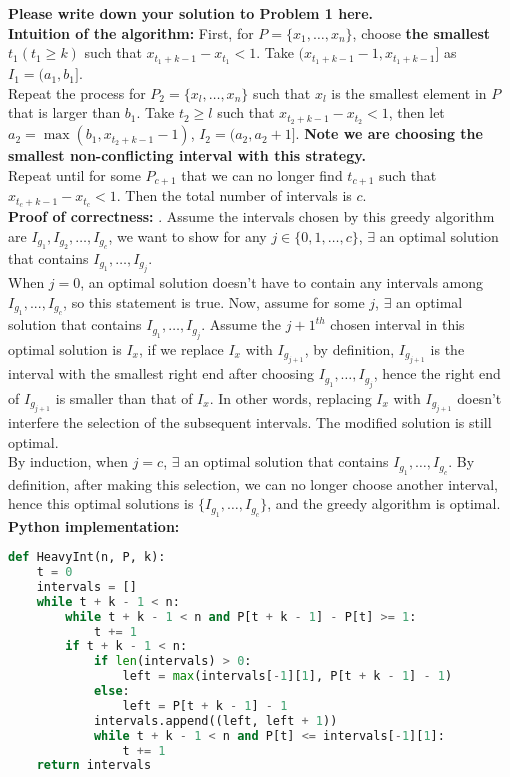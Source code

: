 \documentclass[11pt,twoside]{article}
\newenvironment{solution}{{\par\noindent\it Solution.}}{}
\begin{document}
\begin{solution}
\textbf{Please write down your solution to Problem 1 here.}
\vspace{5pt}\\
\textbf{Intuition of the algorithm: }First, for $P=\{x_1,\dots,x_n\}$, choose \textbf{the smallest} $t_1(t_1\geq k)$ such that $x_{t_1+k-1}-x_{t_1}<1$.
Take $(x_{t_1+k-1}-1,x_{t_1+k-1}]$ as $I_1=(a_1, b_1]$. 
\vspace{5pt}\\
Repeat the process for $P_2=\{x_l,\dots,x_n\}$ such that $x_l$ is the smallest element in $P$ that is larger than $b_1$. Take $t_2\geq l$ such that $x_{t_2+k-1}-x_{t_2}<1$, 
then let $a_2=\max(b_1, x_{t_2+k-1}-1)$, $I_2=(a_2, a_2+1]$. \textbf{Note we are choosing the smallest non-conflicting interval with this strategy.}
\vspace{5pt}\\
Repeat until for some $P_{c+1}$ that we can no longer find $t_{c+1}$ such that $x_{t_c+k-1}-x_{t_c}<1$. Then the total number of intervals is $c$.
\vspace{5pt}\\
\textbf{Proof of correctness: }. Assume the intervals chosen by this greedy algorithm are
$I_{g_1}, I_{g_2},\dots, I_{g_{c}}$, we want to show for any $j\in\{0,1,\dots,c\}$, $\exists$ an optimal solution that contains $I_{g_1},\dots,I_{g_j}$.
\vspace{5pt}\\
When $j=0$, an optimal solution doesn't have to contain any intervals among $I_{g_1},...,I_{g_{c}}$, so this statement is true. 
Now, assume for some $j$, $\exists$ an optimal solution that contains $I_{g_1},\dots,I_{g_j}$. 
Assume the $j+1^{th}$ chosen interval in this optimal solution is $I_x$, if we replace $I_x$ with $I_{g_{j+1}}$, by definition,
$I_{g_{j+1}}$ is the interval with the smallest right end after choosing $I_{g_1},\dots,I_{g_j}$, 
hence the right end of $I_{g_{j+1}}$ is smaller than that of $I_x$. In other words, replacing $I_x$ with $I_{g_{j+1}}$ doesn't interfere the selection of the subsequent intervals.
The modified solution is still optimal.
\vspace{5pt}\\
By induction, when $j=c$, $\exists$ an optimal solution that contains $I_{g_1},\dots, I_{g_{c}}$. 
By definition, after making this selection, we can no longer choose another interval, 
hence this optimal solutions is $\{I_{g_1},\dots, I_{g_{c}}\}$, and the greedy algorithm is optimal.\\
\textbf{Python implementation: }
\begin{lstlisting}[language=Python]
def HeavyInt(n, P, k):
    t = 0
    intervals = []
    while t + k - 1 < n:
        while t + k - 1 < n and P[t + k - 1] - P[t] >= 1:
            t += 1
        if t + k - 1 < n:
            if len(intervals) > 0:
                left = max(intervals[-1][1], P[t + k - 1] - 1)
            else:
                left = P[t + k - 1] - 1
            intervals.append((left, left + 1))
            while t + k - 1 < n and P[t] <= intervals[-1][1]:
                t += 1
    return intervals


\end{lstlisting}
\end{solution}
\end{document}
